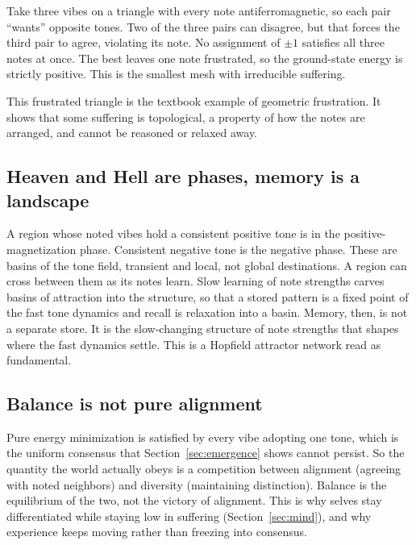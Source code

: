 \begin{proposition}
Take three vibes on a triangle with every note antiferromagnetic, so each pair ``wants'' opposite tones. Two of the three pairs can disagree, but that forces the third pair to agree, violating its note. No assignment of $\pm 1$ satisfies all three notes at once. The best leaves one note frustrated, so the ground-state energy is strictly positive. This is the smallest mesh with irreducible suffering.
\end{proposition}

This frustrated triangle is the textbook example of geometric frustration. It shows that some suffering is topological, a property of how the notes are arranged, and cannot be reasoned or relaxed away.

\subsection{Heaven and Hell are phases, memory is a landscape}

A region whose noted vibes hold a consistent positive tone is in the positive-magnetization phase. Consistent negative tone is the negative phase. These are basins of the tone field, transient and local, not global destinations. A region can cross between them as its notes learn. Slow learning of note strengths carves basins of attraction into the structure, so that a stored pattern is a fixed point of the fast tone dynamics and recall is relaxation into a basin. Memory, then, is not a separate store. It is the slow-changing structure of note strengths that shapes where the fast dynamics settle. This is a Hopfield attractor network read as fundamental.

\subsection{Balance is not pure alignment}

Pure energy minimization is satisfied by every vibe adopting one tone, which is the uniform consensus that Section~\ref{sec:emergence} shows cannot persist. So the quantity the world actually obeys is a competition between alignment (agreeing with noted neighbors) and diversity (maintaining distinction). Balance is the equilibrium of the two, not the victory of alignment. This is why selves stay differentiated while staying low in suffering (Section~\ref{sec:mind}), and why experience keeps moving rather than freezing into consensus.
